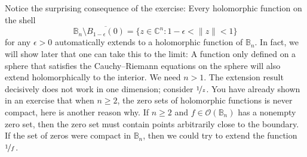 \documentclass[12pt,openany]{book}
\newcommand{\snorm}[1]{\lVert {#1} \rVert}
\newcommand{\C}{{\mathbb{C}}}
\newcommand{\bB}{{\mathbb{B}}}
\newcommand{\sO}{{\mathscr{O}}}
\theoremstyle{plain}
\theoremstyle{remark}
\theoremstyle{definition}
\theoremstyle{exercise}
\theoremstyle{example}
\begin{document}
Notice the surprising consequence of the exercise:
Every holomorphic function on the shell
\begin{equation*}
\bB_n \setminus \overline{B_{1-\epsilon}(0)} =
\bigl\{ z \in \C^n : 1-\epsilon < \snorm{z} < 1 \bigr\}
\end{equation*}
for any $\epsilon > 0$ automatically
extends to a holomorphic function of $\bB_n$.
In fact, we will show later that one can take this to the limit:
A function only defined on a sphere that satisfies the Cauchy--Riemann
equations on the sphere will also extend holomorphically to the interior.
We need $n > 1$.
The extension result decisively does not work in one dimension; consider $\nicefrac{1}{z}$.
You have already shown in an exercise that when $n \geq 2$, the zero
sets of holomorphic functions is never compact, here is another reason why.
If $n \geq 2$ and $f \in \sO(\bB_n)$ has a nonempty zero set,
then the zero set must contain points arbitrarily close to the boundary.
If the set of zeros were compact in $\bB_n$, then we could try to
extend the function $\nicefrac{1}{f}$.
\end{document}
